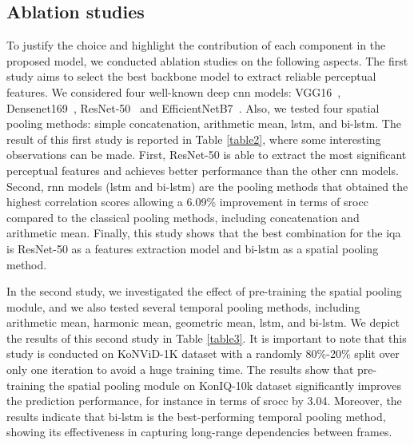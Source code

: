 \documentclass[journal]{IEEEtran}
\begin{document}
 \subsection{Ablation studies} 
To justify the choice and highlight the contribution of each component in the proposed model, we conducted ablation studies on the following aspects. The first study aims to select the best backbone model to extract reliable perceptual features. We considered four well-known deep \ac{cnn} models: VGG16~\cite{zhang2015accelerating},  Densenet169~\cite{huang2017densely}, ResNet-50~\cite{he2016deep} and EfficientNetB7~\cite{tan2019efficientnet}. Also, we tested four spatial pooling methods: simple concatenation, arithmetic mean, \ac{lstm}, and \ac{bi-lstm}. The result of this first study is reported in Table \ref{table2}, where some interesting observations can be made. First, ResNet-50 is able to extract the most significant perceptual features and achieves better performance than the other \ac{cnn} models. Second, \ac{rnn} models (\ac{lstm} and \ac{bi-lstm}) are the pooling methods that obtained the highest correlation scores allowing a 6.09\% improvement in terms of \ac{srocc} compared to the classical pooling methods, including concatenation and arithmetic mean. Finally, this study shows that the best combination for the \ac{iqa} is ResNet-50 as a features extraction model and \ac{bi-lstm} as a spatial pooling method.

In the second study, we investigated the effect of pre-training the spatial pooling module, and we also tested several temporal pooling methods, including arithmetic mean, harmonic mean, geometric mean, \ac{lstm}, and \ac{bi-lstm}. We depict the results of this second study in Table \ref{table3}. It is important to note that this study is conducted on KoNViD-1K dataset with a randomly 80\%-20\% split over only one iteration to avoid a huge training time. The results show that pre-training the spatial pooling module on KonIQ-10k  dataset significantly improves the prediction performance, for instance in terms of \ac{srocc} by 3.04. Moreover, the results indicate that \ac{bi-lstm} is the best-performing temporal pooling method, showing its effectiveness in capturing long-range dependencies between frames.
\end{document}
